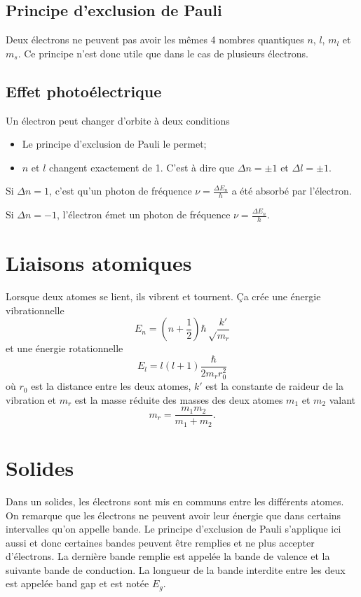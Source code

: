 \subsection{Principe d'exclusion de Pauli}
Deux électrons ne peuvent pas avoir les mêmes 4 nombres quantiques
$n$, $l$, $m_l$ et $m_s$.
Ce principe n'est donc utile que dans le cas de plusieurs électrons.

\subsection{Effet photoélectrique}
Un électron peut changer d'orbite à deux conditions
\begin{itemize}
  \item Le principe d'exclusion de Pauli le permet;
  \item $n$ et $l$ changent exactement de 1.
    C'est à dire que $\Delta n = \pm 1$ et $\Delta l = \pm 1$.
\end{itemize}

Si $\Delta n = 1$, c'est qu'un photon de fréquence
$\nu = \frac{\Delta E_n}{h}$ a été absorbé par l'électron.

Si $\Delta n = -1$, l'électron émet un photon de fréquence
$\nu = \frac{\Delta E_n}{h}$.

\section{Liaisons atomiques}
Lorsque deux atomes se lient,
ils vibrent et tournent.
Ça crée une énergie vibrationnelle
\[ E_n = \left(n + \frac{1}{2}\right)\hbar\sqrt\frac{k'}{m_r} \]
et une énergie rotationnelle
\[ E_l = l(l+1) \frac{\hbar}{2m_rr_0^2} \]
où $r_0$ est la distance entre les deux atomes,
$k'$ est la constante de raideur de la vibration et
$m_r$ est la masse réduite des masses des deux atomes $m_1$ et $m_2$ valant
\[ m_r = \frac{m_1m_2}{m_1+m_2}. \]

\section{Solides}
Dans un solides,
les électrons sont mis en communs entre les différents atomes.
On remarque que les électrons ne peuvent avoir leur énergie que dans certains
intervalles qu'on appelle bande.
Le principe d'exclusion de Pauli s'applique ici aussi et donc certaines
bandes peuvent être remplies et ne plus accepter d'électrons.
La dernière bande remplie est appelée la bande de valence et la suivante
bande de conduction.
La longueur de la bande interdite entre les deux est appelée
band gap et est notée $E_g$.


